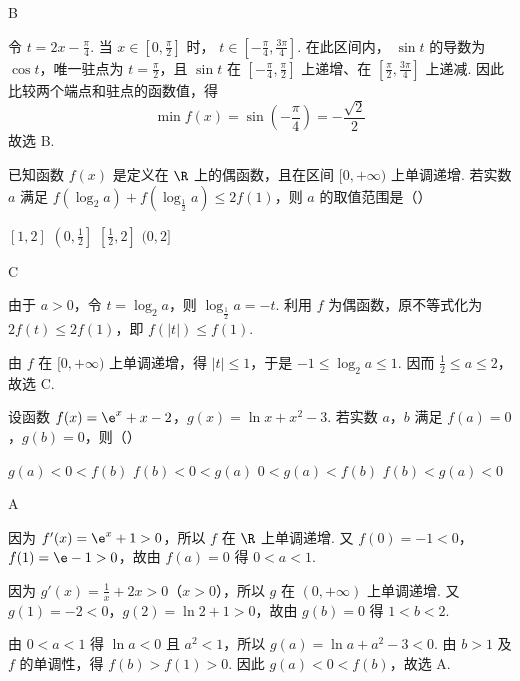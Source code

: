 \begin{answer}
B
\end{answer}

\begin{solution}
令 \(t=2x-\frac{\pi}{4}\). 当 \(x\in\left[0,\frac{\pi}{2}\right]\) 时，
\(t\in\left[-\frac{\pi}{4},\frac{3\pi}{4}\right]\). 在此区间内，
\(\sin t\) 的导数为 \(\cos t\)，唯一驻点为 \(t=\frac{\pi}{2}\)，且 \(\sin t\) 在
\(\left[-\frac{\pi}{4},\frac{\pi}{2}\right]\) 上递增、在
\(\left[\frac{\pi}{2},\frac{3\pi}{4}\right]\) 上递减. 因此比较两个端点和驻点的函数值，得
\[
\min f(x)=\sin\left(-\frac{\pi}{4}\right)=-\frac{\sqrt{2}}{2}
\]
故选 B.
\end{solution}

\begin{problem}
已知函数 \( f(x) \) 是定义在 \( \R \) 上的偶函数，且在区间 \( [0, +\infty) \) 上单调递增. 若实数 \( a \) 满足 \( f(\log_{2} a) + f(\log_{\frac{1}{2}} a) \leqslant 2f(1) \)，则 \( a \) 的取值范围是（\quad）

\choices
    {\([1,2]\)}
    {\(\left(0, \frac{1}{2}\right]\)}
    {\(\left[\frac{1}{2}, 2\right]\)}
    {\((0,2]\)}
\end{problem}

\begin{answer}
C
\end{answer}

\begin{solution}
由于 \(a>0\)，令 \(t=\log_{2}a\)，则 \(\log_{\frac{1}{2}}a=-t\). 利用 \(f\) 为偶函数，原不等式化为
\(2f(t)\leqslant 2f(1)\)，即 \(f(|t|)\leqslant f(1)\).

由 \(f\) 在 \([0,+\infty)\) 上单调递增，得 \(|t|\leqslant 1\)，于是
\(-1\leqslant\log_{2}a\leqslant 1\). 因而 \(\frac{1}{2}\leqslant a\leqslant 2\)，故选 C.
\end{solution}

\begin{problem}
设函数 \( f(x) = \e^{x} + x - 2 \)，\( g(x) = \ln x + x^2 - 3 \). 若实数 \(a\)，\(b\) 满足 \( f(a) = 0 \)，\( g(b) = 0 \)，则（\quad）

\choices
    {\(g(a) < 0 < f(b)\)}
    {\(f(b) < 0 < g(a)\)}
    {\(0 < g(a) < f(b)\)}
    {\(f(b) < g(a) < 0\)}
\end{problem}

\begin{answer}
A
\end{answer}

\begin{solution}
因为 \(f'(x)=\e^x+1>0\)，所以 \(f\) 在 \(\R\) 上单调递增. 又 \(f(0)=-1<0\)，\(f(1)=\e-1>0\)，故由 \(f(a)=0\) 得 \(0<a<1\).

因为 \(g'(x)=\frac{1}{x}+2x>0\)（\(x>0\)），所以 \(g\) 在 \((0,+\infty)\) 上单调递增. 又 \(g(1)=-2<0\)，\(g(2)=\ln 2+1>0\)，故由 \(g(b)=0\) 得 \(1<b<2\).

由 \(0<a<1\) 得 \(\ln a<0\) 且 \(a^2<1\)，所以 \(g(a)=\ln a+a^2-3<0\). 由 \(b>1\) 及 \(f\) 的单调性，得 \(f(b)>f(1)>0\). 因此 \(g(a)<0<f(b)\)，故选 A.
\end{solution}

